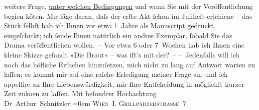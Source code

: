 \begin{ledgroupsized}[t]{13cm}
                    weitere Frage, \uline{unter welchen Bedingungen}{ }{\pb}und wann Sie mit der Veröffentlichung begi{\geminationn}en kö{\geminationn}ten. Mir läge
                    daran, daſs der erſte Akt ſchon im Juliheft erſchiene – das Stück ſelbſt hab ich
                         Ihnen vor etwa 1 Jahre als Manuscript
                    gedruckt, eingeſchickt; ich ſende Ihnen natürlich ein andres Exemplar, ſobald
                    Sie das Drama veröffentlichen wollen. –\pend
           \pstart
           Vor etwa 6 oder 7 Wochen hab {\pb}ich Ihnen eine kleine
                    Skizze geſandt »Die Braut« – was iſt’s mit
                    der? –\pend
           \pstart
           – Jedenfalls will ich noch das höfliche Erſuchen hinzuſetzen, mich nicht zu lang
                    auf Antwort warten zu laſſen; es kommt mir auf eine raſche Erledigung meiner
                    Frage an, und ich appellire an Ihre Liebenswürdigkeit, mir Ihre Entſcheidung in
                    möglichſt kurzer Zeit zu{\pb}ko{\geminationm}en zu laſſen.\pend
           \pstart
           Mit beſondrer Hochachtung{\\[\baselineskip]}\spacefill\mbox{Dr Arthur Schnitzler}\pend
           \leftskip=0em{}\pstart
           \noindent{}\textsc{Wien I. Grillparzerstraße 7}.\pend
           
         
         \endnumbering{}\end{ledgroupsized}  \newcommand{\dateiname}{L00215}\newcommand{\titel}{Arthur Schnitzler an Wilhelm Bölsche, 1. 6. 1893}\newcommand{\editorInnen}{Martin Anton Müller und Gerd-Hermann Susen}
      